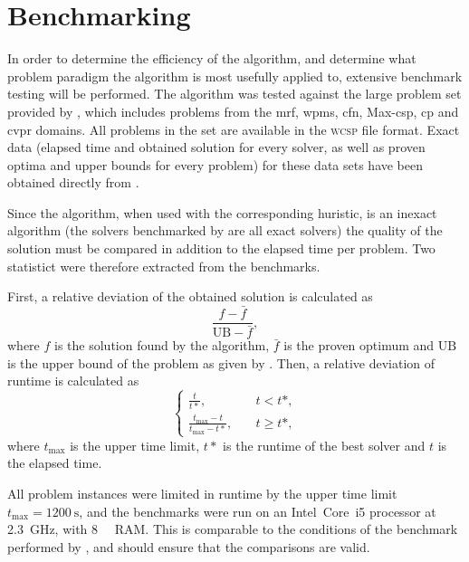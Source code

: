 \section{Benchmarking}
In order to determine the efficiency of the algorithm, and determine what problem paradigm the algorithm is most usefully applied to, extensive benchmark testing will be performed.
The algorithm was tested against the large problem set provided by \textcite{deGivry14}, which includes problems from the \gls{mrf}, \gls{wpms}, \gls{cfn}, Max-\gls{csp}, \gls{cp} and \gls{cvpr} domains.
All problems in the set are available in the \textsc{wcsp} file format.
Exact data (elapsed time and obtained solution for every solver, as well as proven optima and upper bounds for every problem) for these data sets have been obtained directly from \citeauthor{deGivry14}.

Since the algorithm, when used with the corresponding huristic, is an inexact algorithm (the solvers benchmarked by \textcite{deGivry14} are all exact solvers) the quality of the solution must be compared in addition to the elapsed time per problem.
Two statistict were therefore extracted from the benchmarks.

First, a relative deviation of the obtained solution is calculated as
\begin{equation*}
	\frac{f - \bar{f}}{\mathrm{UB} - \bar{f}},
\end{equation*}
where \(f\) is the solution found by the algorithm, \(\bar{f}\) is the proven optimum and \(\mathrm{UB}\) is the upper bound of the problem as given by \textcite[\pno~??]{deGivry14}.
Then, a relative deviation of runtime is calculated as
\begin{equation*}
	\begin{cases}
		\frac{t}{t*}, &\quad t < t*, \\
		\frac{t_{\text{max}} - t}{t_{\text{max}} - t*}, &\quad t \geq t*,
	\end{cases}
\end{equation*}
where \(t_{\text{max}}\) is the upper time limit, \(t*\) is the runtime of the best solver \parencite[of those tested by]{deGivry14} and \(t\) is the elapsed time.

All problem instances were limited in runtime by the upper time limit \(t_{\text{max}} = \SI{1200}{\second}\), and the benchmarks were run on an Intel~Core~i5 processor at \SI{2.3}{\giga\hertz}, with \SI{8}{\gibi\byte} RAM.
This is comparable to the conditions of the benchmark performed by \textcite{deGivry14}, and should ensure that the comparisons are valid.
